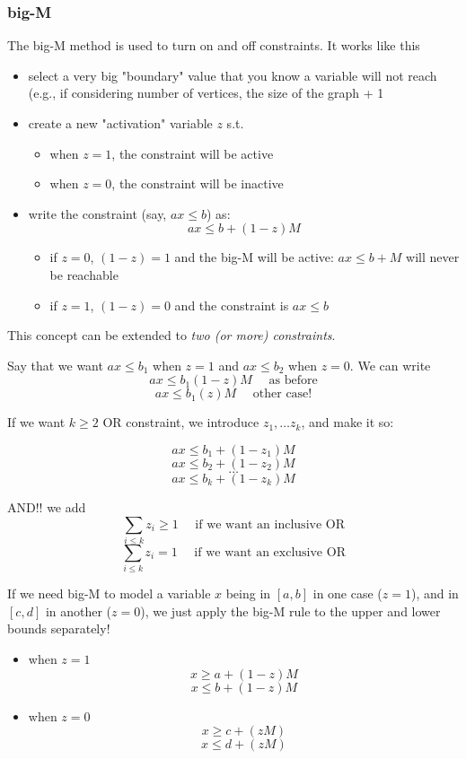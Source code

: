 \documentclass[a4paper, 11pt]{report}
\begin{document}
\subsubsection*{big-M}
The big-M method is used to turn on and off constraints. It works like this 
\begin{itemize}
    \item select a very big "boundary" value that you know a variable will not reach (e.g., if considering number of vertices, the size of the graph + 1
    \item create a new "activation" variable $z$ s.t.
        \begin{itemize}
            \item when $z = 1$, the constraint will be active
            \item when $z = 0$, the constraint will be inactive
        \end{itemize}
    \item write the constraint (say, $ax \leq  b$) as:
        $$ a x \leq b + (1-z)M $$
        \begin{itemize}
            \item if $z = 0$, $(1-z) = 1$ and the big-M will be active: $ax \leq b + M$ will never be reachable
            \item if $z = 1$, $(1-z) = 0$ and the constraint is $ax \leq b$
        \end{itemize}

\end{itemize}

This concept can be extended to \textit{two (or more) constraints}.

Say that we want $ax \leq b_1$ when $z = 1$ and $ax \leq  b_2$ when $z = 0$. We can write
$$ ax \leq b_1 (1-z)M \quad \text{ as before}$$
$$ ax \leq b_1 (z)M \quad \text{ other case!}$$

If we want $k \geq 2$ OR constraint, we introduce $z_1, \dots z_{k}$, and make it so:

$$ ax \leq b_1 +(1-z_1)M $$
$$ ax \leq b_2+ (1-z_2)M $$
$$  \dots  $$
$$ ax \leq b_k +(1-z_{k})M $$

AND!! we add
$$ \sum_{i \leq k} z_{i} \geq 1 \quad \text{ if we want an inclusive OR} $$
$$ \sum_{i \leq k} z_{i} = 1 \quad \text{ if we want an exclusive OR} $$

If we need big-M to model a variable $x$ being in $[a,b]$ in one case ($z=1$), and in $[c, d]$ in another ($z=0$), we just apply the big-M rule to the upper and lower bounds separately!
\begin{itemize}
    \item when $z=1$
        $$ x \geq a +(1-z)M$$
        $$ x \leq b +(1-z)M$$
    \item when $z=0$
        $$ x \geq c+ (zM) $$
        $$ x \leq d +(zM) $$
\end{itemize}
\end{document}
